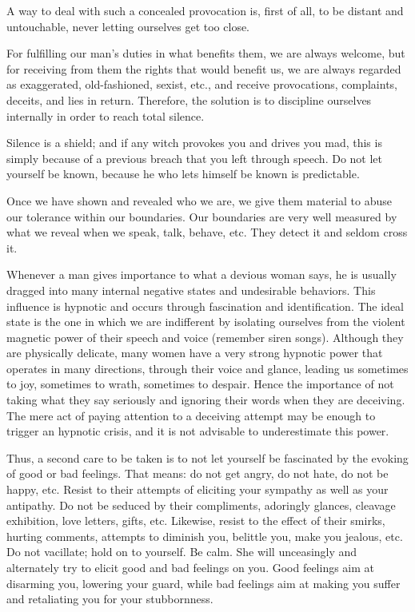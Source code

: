 \par A way to deal with such a concealed provocation is, first of all, to be distant and untouchable, never letting ourselves get too close.

\par For fulfilling our man's duties in what benefits them, we are always welcome, but for receiving from them the rights that would benefit us, we are always regarded as exaggerated, old-fashioned, sexist, etc., and receive provocations, complaints, deceits, and lies in return. Therefore, the solution is to discipline ourselves internally in order to reach total silence.

\par Silence is a shield; and if any witch provokes you and drives you mad, this is simply because of a previous breach that you left through speech. Do not let yourself be known, because he who lets himself be known is predictable.

\par Once we have shown and revealed who we are, we give them material to abuse our tolerance within our boundaries. Our boundaries are very well measured by what we reveal when we speak, talk, behave, etc. They detect it and seldom cross it.

\par Whenever a man gives importance to what a devious woman says, he is usually dragged into many internal negative states and undesirable behaviors. This influence is hypnotic and occurs through fascination and identification. The ideal state is the one in which we are indifferent by isolating ourselves from the violent magnetic power of their speech and voice (remember siren songs\footnotemark[33]). Although they are physically delicate, many women have a very strong hypnotic power that operates in many directions, through their voice and glance, leading us sometimes to joy, sometimes to wrath, sometimes to despair. Hence the importance of not taking what they say seriously and ignoring their words when they are deceiving. The mere act of paying attention to a deceiving attempt may be enough to trigger an hypnotic crisis, and it is not advisable to underestimate this power.


\par Thus, a second care to be taken is to not let yourself be fascinated by the evoking of good or bad feelings. That means: do not get angry, do not hate, do not be happy, etc. Resist to their attempts of eliciting your sympathy as well as your antipathy. Do not be seduced by their compliments, adoringly glances, cleavage exhibition, love letters, gifts, etc. Likewise, resist to the effect of their smirks, hurting comments, attempts to diminish you, belittle you, make you jealous\footnotemark[34], etc. Do not vacillate; hold on to yourself. Be calm. She will unceasingly and alternately try to elicit good and bad feelings on you. Good feelings aim at disarming you, lowering your guard, while bad feelings aim at making you suffer and retaliating you for your stubbornness.

